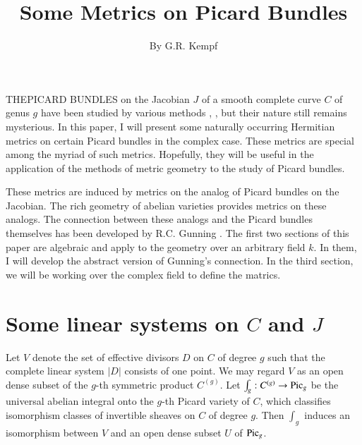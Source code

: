 \title{Some Metrics on Picard Bundles}\label{chap8}

\author{By G.R. Kempf}

\date{}
\maketitle

\setcounter{page}{165}

\setcounter{pageoriginal}{216}
THE\pageoriginale PICARD BUNDLES on the Jacobian $J$ of a smooth
complete curve $C$ of genus $g$ have been studied by various
methods \cite{chap8-key1}, \cite{chap8-key2},  but their nature still
remains mysterious. In this paper, I will present some naturally
occurring Hermitian metrics on certain Picard bundles in the complex
case. These metrics are special among the myriad of such
metrics. Hopefully, they will be useful in the application of the
methods of metric geometry to the study of Picard bundles.

These metrics are induced by metrics on the analog of Picard bundles
on the Jacobian. The rich geometry of abelian varieties provides
metrics on these analogs. The connection between these analogs and the
Picard bundles themselves has been developed by
R.C. Gunning \cite{chap8-key1}. The first two sections of this paper
are algebraic and apply to the geometry over an arbitrary field
$k$. In them, I will develop the abstract version of Gunning's
connection. In the third section, we will be working over the complex
field to define the matrics.

\section{Some linear systems on \texorpdfstring{$C$}{C} and \texorpdfstring{$J$}{J}}\label{chap8-sec1}

Let $V$ denote the set of effective divisors $D$ on $C$ of degree $g$
such that the complete linear system $|D|$ consists of one point. We
may regard $V$ as an open dense subset of the $g$-th symmetric product
$C^{(g)}$. Let $\int_{g}:C^{(g)}\to \operatorname{Pic}_{g}$ be the universal abelian
integral onto the $g$-th Picard variety of $C$, which classifies
isomorphism classes of invertible sheaves on $C$ of degree $g$. Then
$\int_{g}$ induces an isomorphism between $V$ and an open dense subset
$U$ of $\operatorname{Pic}_{g}$. 

